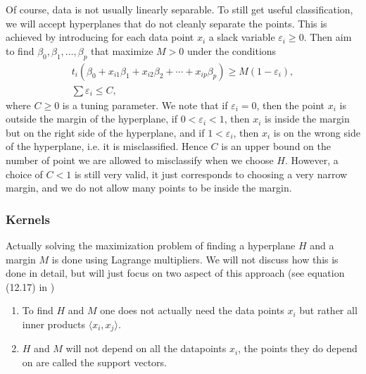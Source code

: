 \documentclass[parskip=half]{scrartcl}
\theoremstyle{definition}
\theoremstyle{remark}
\begin{document}
Of course, data is not usually linearly separable. 
To still get useful classification, we will accept hyperplanes that do not cleanly separate the points. 
This is achieved by introducing for each data point $x_i$ a slack variable $\varepsilon_i \geq 0$. 
Then aim to find $\beta_0, \beta_1, \ldots, \beta_p$ that maximize $M > 0$ under the conditions 
\begin{gather*}
	t_i(\beta_0 + x_{i1} \beta_1 + x_{i2} \beta_2 + \cdots + x_{ip} \beta_p) \geq M(1-\varepsilon_i), \\
	\sum \varepsilon_i \leq C,	
\end{gather*} 
where $C \geq 0$ is a tuning parameter.
We note that if $\varepsilon_i = 0$, then the point $x_i$ is outside the margin of the hyperplane, if $0 < \varepsilon_i < 1$, then $x_i$ is inside the margin but on the right side of the hyperplane, and if $1 < \varepsilon_i$, then $x_i$ is on the wrong side of the hyperplane, i.e. it is misclassified.  
Hence $C$ is an upper bound on the number of point we are allowed to misclassify when we choose $H$.
However, a choice of $C < 1$ is still very valid, it just corresponds to choosing a very narrow margin, and we do not allow many points to be inside the margin.    

\subsubsection{Kernels} \label{sssec:kernels}
 
Actually solving the maximization problem of finding a hyperplane $H$ and a margin $M$ is done using Lagrange multipliers. 
We will not discuss how this is done in detail, but will just focus on two aspect of this approach (see equation (12.17) in \cite{htf:esl})
\begin{enumerate}
	\item To find $H$ and $M$ one does not actually need the data points $x_i$ but rather all inner products $\langle x_i, x_j \rangle$. 
	\item $H$ and $M$ will not depend on all the datapoints $x_i$, the points they do depend on are called the support vectors. 
\end{enumerate}
\end{document}
